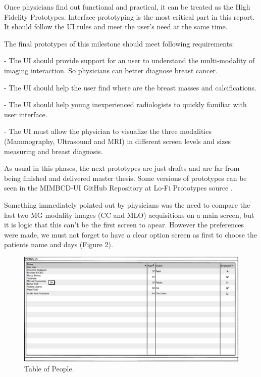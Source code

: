Once physicians find out functional and practical, it can be treated as the High Fidelity Prototypes. Interface prototyping is the most critical part in this report. It should follow the UI rules and meet the user’s need at the same time.

The final prototypes of this milestone should meet following requirements:

- The UI should provide support for an user to understand the multi-modality of imaging interaction. So physicians can better diagnose breast cancer.

- The UI should help the user find where are the breast masses and calcifications.

- The UI should help young inexperienced radiologists to quickly familiar with
user interface.

- The UI must allow the physician to visualize the three modalities (Mammography, Ultrasound and MRI) in different screen levels and sizes measuring and breast diagnosis.

As usual in this phases, the next prototypes are just drafts and are far from being finished and delivered master thesis. Some versions of prototypes can be seen in the MIMBCD-UI GitHub Repository at Lo-Fi Prototypes source \cite{mimbcdUILoFiPrototypes}.

\clearpage

Something immediately pointed out by physicians was the need to compare the last two MG modality images (CC and MLO) acquisitions on a main screen, but it is logic that this can't be the first screen to apear. However the preferences were made, we must not forget to have a clear option screen as first to choose the patients name and days (Figure 2).

\begin{figure}[!hbt]
\centering
\includegraphics[width=1.00\textwidth]{tabela_pessoas.png}
\caption{\label{PT}Table of People.
}
\end{figure}

